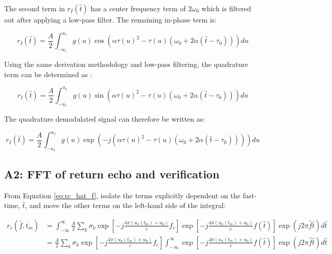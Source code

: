 \documentclass[fleqn,10pt]{olplainarticle}
\begin{document}
\noindent The second term in $r_{I}(\hat{t})$ has a center frequency term of $2\omega_{0}$ which is filtered out after applying a low-pass filter. The remaining in-phase term is:

\begin{equation}
    r_{I}(\hat{t}) = \frac{A}{2} \int_{-u_{1}}^{u_{1}} g(u) \cos(\alpha\tau(u)^{2} - \tau(u)(\omega_{0} + 2\alpha(\hat{t} - \tau_{0}))) du
\end{equation}

\noindent Using the same derivation methodology and low-pass filtering, the quadrature term can be determined as \citep{Jakowatz1996}:

\begin{equation}
    r_{I}(\hat{t}) = \frac{A}{2} \int_{-u_{1}}^{u_{1}} g(u) \sin(\alpha\tau(u)^{2} - \tau(u)(\omega_{0} + 2\alpha(\hat{t} - \tau_{0}))) du
\end{equation}

\noindent The quadrature demodulated signal can therefore be written as:

\begin{equation}
    r_{I}(\hat{t}) = \frac{A}{2} \int_{-u_{1}}^{u_{1}} g(u) \exp(-j(\alpha\tau(u)^{2} - \tau(u)(\omega_{0} + 2\alpha(\hat{t} - \tau_{0})))) du
\end{equation}


\subsection*{A2: FFT of return echo and verification}\label{ap:fft}
From Equation \ref{eq:rc_hat_f}, isolate the terms explicitly dependent on the fast-time, $\hat{t}$, and move the other terms on the left-hand side of the integral:

\begin{equation}
\begin{aligned}
    r_{c}(\hat{f}, t_{m}) &= \int_{-\infty}^{\infty} \frac{A}{2} \sum_{k}\sigma_{k} \exp \left[ -j \frac{4\pi (u_{k}(t_m) + u_{0})}{c} f_{c}\right]
    \exp \left[ -j \frac{4\pi (u_{k}(t_m) + u_{0})}{c} f(\hat{t})\right]
    \exp(j 2 \pi \hat{f}\hat{t}) d\hat{t} \\
    &= \frac{A}{2} \sum_{k}\sigma_{k} \exp \left[ -j \frac{4\pi (u_{k}(t_m) + u_{0})}{c} f_{c}\right]\int_{-\infty}^{\infty} 
    \exp \left[ -j \frac{4\pi (u_{k}(t_m) + u_{0})}{c} f(\hat{t})\right]
    \exp(j 2 \pi \hat{f}\hat{t}) d\hat{t}
\end{aligned}
\end{equation}
\end{document}
